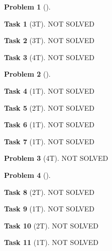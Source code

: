 \documentclass[11pt,twoside]{article}
\theoremstyle{definition}
\newtheorem{amsproblem}{Problem}
\newtheorem{amssubproblem}{Task}[amsproblem]
\newenvironment{problem}[1][]{%
  \begin{amsproblem}[#1]
  }{%
  \end{amsproblem}
}
\newenvironment{subproblem}[1][]{%
  \begin{amssubproblem}[#1]
  }{%
  \end{amssubproblem}
}
\newcommand{\TP}[1]{#1T}
\begin{document}
\begin{problem}
  \begin{subproblem}[\TP{3}]
    NOT SOLVED %
  \end{subproblem}
  \begin{subproblem}[\TP{3}]
    NOT SOLVED %
  \end{subproblem}
  \begin{subproblem}[\TP{4}]
    NOT SOLVED %
  \end{subproblem}
\end{problem}

\noindent
\hrulefill

\begin{problem}
  \begin{subproblem}[\TP{1}]
    NOT SOLVED %
  \end{subproblem}
  \begin{subproblem}[\TP{2}]
    NOT SOLVED %
  \end{subproblem}
  \begin{subproblem}[\TP{1}]
    NOT SOLVED %
  \end{subproblem}
  \begin{subproblem}[\TP{1}]
    NOT SOLVED %
  \end{subproblem}
\end{problem}

\noindent
\hrulefill

\begin{problem}[\TP{4}]
  NOT SOLVED %
\end{problem}

\noindent
\hrulefill

\begin{problem}
  \begin{subproblem}[\TP{2}]
    NOT SOLVED %
  \end{subproblem}
  \begin{subproblem}[\TP{1}]
    NOT SOLVED %
  \end{subproblem}
  \begin{subproblem}[\TP{2}]
    NOT SOLVED %
  \end{subproblem}
  \begin{subproblem}[\TP{1}]
    NOT SOLVED %
  \end{subproblem}
\end{problem}
\end{document}
